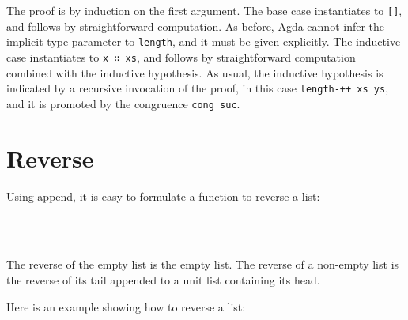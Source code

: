 The proof is by induction on the first argument. The base case
instantiates to \texttt{{[}{]}}, and follows by straightforward
computation. As before, Agda cannot infer the implicit type parameter to
\texttt{length}, and it must be given explicitly. The inductive case
instantiates to \texttt{x\ ∷\ xs}, and follows by straightforward
computation combined with the inductive hypothesis. As usual, the
inductive hypothesis is indicated by a recursive invocation of the
proof, in this case \texttt{length-++\ xs\ ys}, and it is promoted by
the congruence \texttt{cong\ suc}.

\hypertarget{reverse}{%
\section{Reverse}\label{reverse}}

Using append, it is easy to formulate a function to reverse a list:

\begin{fence}
\begin{code}%
\>[0]\AgdaSpace{}%
\AgdaSymbol{:}\AgdaSpace{}%
\AgdaSpace{}%
\AgdaSymbol{\{}\AgdaSpace{}%
\AgdaSymbol{:}\AgdaSpace{}%
\AgdaSymbol{\}}\AgdaSpace{}%
\AgdaSpace{}%
\AgdaSpace{}%
\AgdaSpace{}%
\AgdaSpace{}%
\AgdaSpace{}%
\<%
\\
\>[0]\AgdaSpace{}%
\AgdaInductiveConstructor{[]}%
\>[18]\AgdaSymbol{=}%
\>[21]\AgdaInductiveConstructor{[]}\<%
\\
\>[0]\AgdaSpace{}%
\AgdaSymbol{(}\AgdaSpace{}%
\AgdaSpace{}%
\AgdaSymbol{)}%
\>[18]\AgdaSymbol{=}%
\>[21]\AgdaSpace{}%
\AgdaSpace{}%
\AgdaOperator{\AgdaFunction{++}}\AgdaSpace{}%
\AgdaOperator{\AgdaInductiveConstructor{[}}\AgdaSpace{}%
\AgdaSpace{}%
\AgdaOperator{\AgdaInductiveConstructor{]}}\<%
\end{code}
\end{fence}

The reverse of the empty list is the empty list. The reverse of a
non-empty list is the reverse of its tail appended to a unit list
containing its head.

Here is an example showing how to reverse a list:

